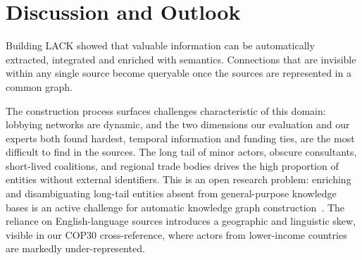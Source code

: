 \vspace{-0.3cm}\section{Discussion and Outlook}\vspace{-0.3cm}
\label{sec:discussion}\begin{sloppypar}
Building LACK showed that valuable information can be automatically extracted, integrated and enriched with semantics.
Connections that are invisible within any single source become queryable once the sources are represented in a common graph. %

The construction process surfaces challenges characteristic of this domain: lobbying networks are dynamic, and the two dimensions our evaluation and our experts both found hardest, temporal information and funding ties, are the most difficult to find in the sources.
The long tail of minor actors, obscure consultants, short-lived coalitions, and regional trade bodies drives the high proportion of entities without external identifiers. 
This is an open research problem: enriching and disambiguating long-tail entities absent from general-purpose knowledge bases is an active challenge for automatic knowledge graph construction~\cite{graciotti2025lost}.
The reliance on English-language sources introduces a geographic and linguistic skew, visible in our COP30 cross-reference, where actors from lower-income countries are markedly under-represented.


\end{sloppypar}
